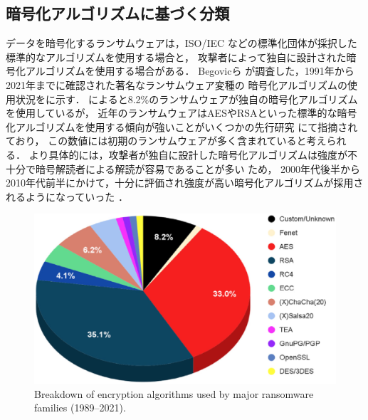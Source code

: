 \subsection{暗号化アルゴリズムに基づく分類}
データを暗号化するランサムウェアは，ISO/IEC \cite{ISOIEC2784:online} などの標準化団体が採択した標準的なアルゴリズムを使用する場合と，
攻撃者によって独自に設計された暗号化アルゴリズムを使用する場合がある．
Begovicら \cite{begovic2023cryptographic} が調査した，1991年から2021年までに確認された著名なランサムウェア変種の
暗号化アルゴリズムの使用状況をに示す．
によると8.2\%のランサムウェアが独自の暗号化アルゴリズムを使用しているが，
近年のランサムウェアはAESやRSAといった標準的な暗号化アルゴリズムを使用する傾向が強いことがいくつかの先行研究 \cite{Evolution-Ransomware,key-management}にて指摘されており，
この数値には初期のランサムウェアが多く含まれていると考えられる．
より具体的には，攻撃者が独自に設計した暗号化アルゴリズムは強度が不十分で暗号解読者による解読が容易であることが多い \cite{key-management}ため，
2000年代後半から2010年代前半にかけて，十分に評価され強度が高い暗号化アルゴリズムが採用されるようになっていった \cite{Evolution-Ransomware}．

\begin{figure}[tb]
  \begin{center}
    \includegraphics[width=0.8\columnwidth]{./doc/img/encrypt_algo.eps}
  \end{center}
  \caption{Breakdown of encryption algorithms used by major ransomware families (1989–2021). \cite{begovic2023cryptographic}}
  \label{fig:encrypt_algo}
\end{figure}

